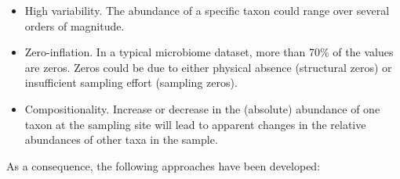 \documentclass[
]{book}
\begin{document}
\begin{itemize}
\item
  High variability. The abundance of a specific taxon could range over
  several orders of magnitude.
\item
  Zero-inflation. In a typical microbiome dataset, more than 70\% of the
  values are zeros. Zeros could be due to either physical absence
  (structural zeros) or insufficient sampling effort (sampling zeros).
\item
  Compositionality. Increase or decrease in the (absolute) abundance of
  one taxon at the sampling site will lead to apparent changes in the
  relative abundances of other taxa in the sample.
\end{itemize}

As a consequence, the following approaches have been developed:
\end{document}
